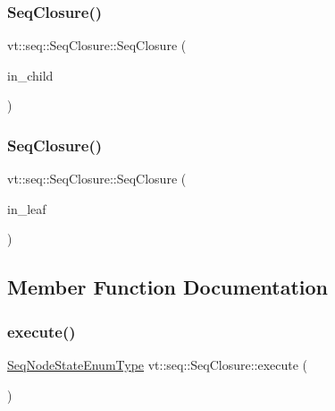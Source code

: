\subsubsection{\texorpdfstring{Seq\+Closure()}{SeqClosure()}\hspace{0.1cm}{\footnotesize\ttfamily [1/2]}}
{\footnotesize\ttfamily vt\+::seq\+::\+Seq\+Closure\+::\+Seq\+Closure (\begin{DoxyParamCaption}\item[{\hyperlink{namespacevt_1_1seq_ae6a4874b585be0612aaca32ca6d2d191}{Seq\+Node\+Ptr\+Type}}]{in\+\_\+child }\end{DoxyParamCaption})\hspace{0.3cm}{\ttfamily [explicit]}}

\mbox{\label{structvt_1_1seq_1_1_seq_closure_a9d4b343e005128e44324846f46336a92}} 
\subsubsection{\texorpdfstring{Seq\+Closure()}{SeqClosure()}\hspace{0.1cm}{\footnotesize\ttfamily [2/2]}}
{\footnotesize\ttfamily vt\+::seq\+::\+Seq\+Closure\+::\+Seq\+Closure (\begin{DoxyParamCaption}\item[{\hyperlink{namespacevt_1_1seq_a13c76fb1c62795dfd2d359b2dde35e8a}{Seq\+Leaf\+Closure\+Type}}]{in\+\_\+leaf }\end{DoxyParamCaption})\hspace{0.3cm}{\ttfamily [explicit]}}



\subsection{Member Function Documentation}
\mbox{\label{structvt_1_1seq_1_1_seq_closure_a50a3833f66d0527231bf50ba3ea4d149}} 
\subsubsection{\texorpdfstring{execute()}{execute()}}
{\footnotesize\ttfamily \hyperlink{namespacevt_1_1seq_ad7b0496818667d816e00f717491d3b92}{Seq\+Node\+State\+Enum\+Type} vt\+::seq\+::\+Seq\+Closure\+::execute (\begin{DoxyParamCaption}{ }\end{DoxyParamCaption})}



